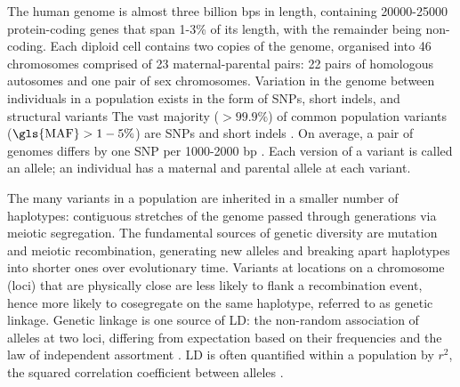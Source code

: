 \begin{outline}
\1 The human genome is almost three billion \glspl{bp} in length, 
containing 20000-25000 protein-coding genes \autocite{theencodeprojectconsortium2012IntegratedEncyclopediaDNA,1000genomesprojectconsortium2015GlobalReferenceHuman} that span 1-3\% of its length, 
with the remainder being non-coding.
Each diploid cell contains two copies of the genome, organised into 46 chromosomes comprised of 23 maternal-parental pairs: 22 pairs of homologous autosomes and one pair of sex chromosomes.
%
\1 Variation in the genome between individuals in a population exists in the form of \glspl{SNP}, short indels, and structural variants
The vast majority ($> 99.9\%$) of common population variants ($\text{\gls{MAF}} > 1-5\%$) are \glspl{SNP} and short indels \autocite{1000genomesprojectconsortium2015GlobalReferenceHuman}.
On average, a pair of genomes differs by one \gls{SNP} per 1000-2000 \gls{bp} \autocite{theinternationalsnpmapworkinggroup2001MapHumanGenome}.
Each version of a variant is called an allele; an individual has a maternal and parental allele at each variant.

\1 The many variants in a population are inherited in a smaller number of haplotypes: 
contiguous stretches of the genome passed through generations via meiotic segregation.
The fundamental sources of genetic diversity are mutation and meiotic recombination, generating new alleles and breaking apart haplotypes into shorter ones over evolutionary time.
Variants at locations on a chromosome (loci) that are physically close are less likely to flank a recombination event, hence more likely to cosegregate on the same haplotype, referred to as genetic linkage.
Genetic linkage is one source of \gls{LD}: the non-random association of alleles at two loci, differing from expectation based on their frequencies and the law of independent assortment \autocite{slatkin2008LinkageDisequilibriumUnderstanding}.
\gls{LD} is often quantified within a population by $r^2$, the squared correlation coefficient between alleles \autocite{slatkin2008LinkageDisequilibriumUnderstanding}.


\end{outline}
